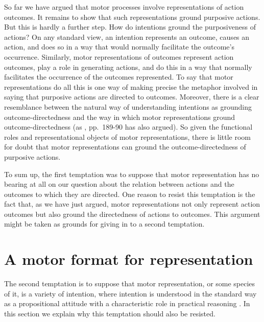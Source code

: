 \documentclass[12pt,\papersize]{extarticle}
\begin{document}
So far we have argued that motor processes involve representations of action outcomes. It remains to show that such representations ground purposive actions. But this is hardly a further step. How do intentions ground the purposiveness of actions?  On any standard view, an intention represents an outcome, causes an action, and does so in a way that would normally facilitate the outcome's occurrence. Similarly, motor representations of outcomes represent action outcomes, play a role in generating actions, and do this in a way that normally facilitates the occurrence of the outcomes represented. To say that motor representations do all this is one way of making precise the metaphor involved in saying that purposive actions are directed to outcomes.  Moreover, there is a clear resemblance between the natural way of understanding intentions as grounding outcome-directedness and the way in which motor representations ground outcome-directedness (as \citealp{pacherie:2008_action}, pp.\ 189-90 has also argued).  So given the functional roles and representational objects of motor representations, there is little room for doubt that motor representations can ground the outcome-directedness of purposive actions.

To sum up, the first temptation was to suppose that motor representation has no bearing at all on our question about the relation between actions and the outcomes to which they are directed. One reason to resist this temptation is the fact that, as we have just argued, motor representations not only represent action outcomes but also ground the directedness of actions to outcomes.  This argument might be taken as grounds for giving in to a second temptation.



\section{A motor format for representation}
The second temptation is to suppose that motor representation, or some species of it, is a variety of intention, where intention is understood in the standard way as a propositional attitude with a characteristic role in practical reasoning \citep{Bratman:1987xw}. In this section we explain why this temptation should also be resisted.
\end{document}
